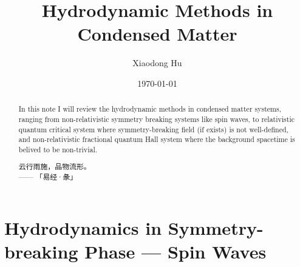 \documentclass[10pt,nofootinbib]{revtex4}
\begin{document}
\title{Hydrodynamic Methods in Condensed Matter}
\author{Xiaodong Hu}

\date{\today}

\begin{abstract}
	In this note I will review the hydrodynamic methods in condensed matter systems, ranging from non-relativistic symmetry breaking systems like spin waves, to relativistic quantum critical system where symmetry-breaking field (if exists) is not well-defined, and non-relativistic fractional quantum Hall system where the background spacetime is belived to be non-trivial.\par
		\hfill\par
		{\centering\kaishu 云行雨施，品物流形。\\[0.5em]}
	\hfill------ 「易经·彖」
\end{abstract}

\maketitle
\tableofcontents

\section{Hydrodynamics in Symmetry-breaking Phase --- Spin Waves}
\end{document}
